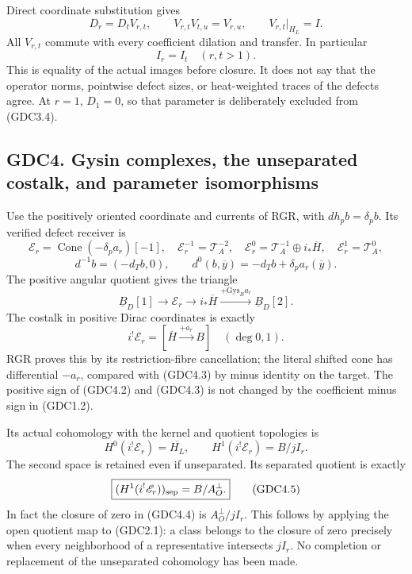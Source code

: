 Direct coordinate substitution gives \[
D_r=D_tV_{r,t},\qquad V_{r,t}V_{t,u}=V_{r,u},\qquad
V_{r,t}|_{H_L}=I.
\tag{GDC3.3}
\] All \(V_{r,t}\) commute with every coefficient dilation and transfer.
In particular \[
\boxed{I_r=I_t\quad(r,t>1).}
\tag{GDC3.4}
\] This is equality of the actual images before closure. It does not say
that the operator norms, pointwise defect sizes, or heat-weighted traces
of the defects agree. At \(r=1\), \(D_1=0\), so that parameter is
deliberately excluded from (GDC3.4).

\subsection{GDC4. Gysin complexes, the unseparated costalk, and
parameter
isomorphisms}\label{gdc4.-gysin-complexes-the-unseparated-costalk-and-parameter-isomorphisms}

Use the positively oriented coordinate and currents of RGR, with
\(dh_p b=\delta_pb\). Its verified defect receiver is \[
\mathscr E_r=\operatorname{Cone}(-\delta_pa_r)[-1],
\quad
\mathscr E_r^{-1}=\mathscr T_A^{-2},\quad
\mathscr E_r^0=\mathscr T_A^{-1}\oplus i_*\overline H,\quad
\mathscr E_r^1=\mathscr T_A^0,
\] \[
d^{-1}b=(-d_Tb,0),\qquad d^0(b,\overline y)=-d_Tb+\delta_pa_r(\overline y).
\tag{GDC4.1}
\] The positive angular quotient gives the triangle \[
\underline B_D[1]\to\mathscr E_r\to i_*\overline H
\xrightarrow{+\mathrm{Gys}_B a_r}\underline B_D[2].
\tag{GDC4.2}
\] The costalk in positive Dirac coordinates is exactly \[
i^!\mathscr E_r=[\overline H\xrightarrow{+a_r}B]\quad(\deg0,1).
\tag{GDC4.3}
\] RGR proves this by its restriction-fibre cancellation; the literal
shifted cone has differential \(-a_r\), compared with (GDC4.3) by minus
identity on the target. The positive sign of (GDC4.2) and (GDC4.3) is
not changed by the coefficient minus sign in (GDC1.2).

Its actual cohomology with the kernel and quotient topologies is \[
H^0(i^!\mathscr E_r)=\overline{H_L},\qquad
H^1(i^!\mathscr E_r)=B/jI_r.
\tag{GDC4.4}
\] The second space is retained even if unseparated. Its separated
quotient is exactly \[
\boxed{(H^1(i^!\mathscr E_r))_{\rm sep}=B/A_O^\perp.}
\tag{GDC4.5}
\] In fact the closure of zero in (GDC4.4) is \(A_O^\perp/jI_r\). This
follows by applying the open quotient map to (GDC2.1): a class belongs
to the closure of zero precisely when every neighborhood of a
representative intersects \(jI_r\). No completion or replacement of the
unseparated cohomology has been made.

